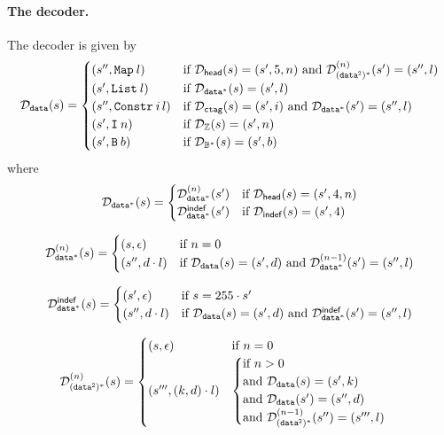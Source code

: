 \paragraph{The decoder.} The decoder is given by
$$
\mathcal{D}_{\mathtt{data}}(s) =
\begin{cases}
  (s'', \mathtt{Map}\: l) & \text{if $\mathcal{D}_{\mathsf{head}}(s) = (s', 5, n)$ and $\mathcal{D}_{\mathtt{(data^2)^*}}^{(n)}(s') = (s'', l)$}\\
  (s', \mathtt{List}\: l) & \text{if $\mathcal{D}_{\mathtt{data^*}}(s) = (s', l)$}\\
  (s'', \mathtt{Constr}\: i \, l) & \text{if $\mathcal{D}_{\texttt{ctag}}(s) = (s', i)$ and $\mathcal{D}_{\mathtt{data^*}}(s') = (s'', l)$}\\
  (s', \mathtt{I}\: n) & \text{if $\mathcal{D}_{\mathbb{Z}}(s) = (s', n)$}\\
  (s', \mathtt{B}\: b) & \text{if $\mathcal{D}_{\mathbb{B}^*}(s) = (s', b)$}
\end{cases}
$$
where
$$
\mathcal{D}_{\mathtt{data^*}}(s) =
\begin{cases}
  \mathcal{D}_{\mathtt{data^*}}^{(n)}(s') & \text{if $\mathcal{D}_{\mathsf{head}}(s) = (s', 4, n)$}\\
  \mathcal{D}_{\mathtt{data^*}}^{\mathsf{indef}}(s') & \text{if $\mathcal{D}_{\mathsf{indef}}(s) = (s', 4)$}
\end{cases}
$$

$$
\mathcal{D}_{\mathtt{data^*}}^{(n)}(s) =
\begin{cases}
  (s, \epsilon) & \text{if $n = 0$}\\
  (s'', d \cdot l) & \text{if $\mathcal{D}_{\mathtt{data}}(s) = (s', d)$ and $\mathcal{D}_{\mathtt{data^*}}^{(n-1)}(s') = (s'', l)$}\\
\end{cases}
$$

$$
\mathcal{D}_{\mathtt{data^*}}^{\mathsf{indef}}(s) =
\begin{cases}
  (s', \epsilon) & \text{if $s = 255 \cdot s' $}\\
  (s'', d \cdot l) & \text{if $\mathcal{D}_{\mathtt{data}}(s) = (s', d)$ and $\mathcal{D}_{\mathtt{data^*}}^{\mathsf{indef}}(s') = (s'', l)$}\\
\end{cases}
$$


\medskip
$$
\mathcal{D}_{\mathtt{(data^2)^*}}^{(n)}(s) =
\begin{cases}
  (s, \epsilon) & \text{if $n=0$}\\
  (s''', (k,d) \cdot l) &
  \begin{cases}
    \text{if $n > 0$}\\
    \text{and $\mathcal{D}_{\mathtt{data}}(s) = (s', k)$}\\
    \text{and $\mathcal{D}_{\mathtt{data}}(s') = (s'', d)$}\\
    \text{and $\mathcal{D}_{\mathtt{(data^2)^*}}^{(n-1)}(s'') = (s''', l)$}
  \end{cases}
\end{cases}
$$

